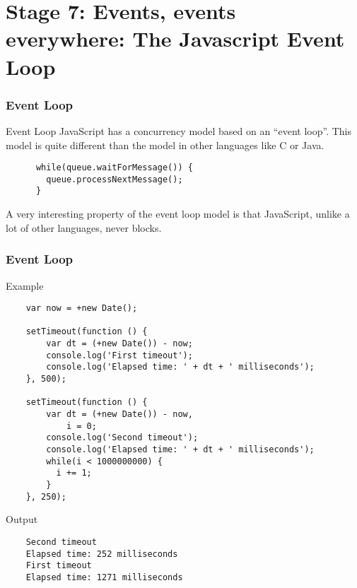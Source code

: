 \section{Stage 7: Events, events everywhere: The Javascript Event Loop}

\begin{frame}[fragile]
  \frametitle{Event Loop}
  \begin{block}{Event Loop}
    JavaScript has a concurrency model based on an ``event loop''. This model is quite different than the model in other languages like C or Java.
    {\scriptsize
    \begin{verbatim}
      while(queue.waitForMessage()) {
        queue.processNextMessage();
      }
    \end{verbatim}
    }
    \pause
    A very interesting property of the event loop model is that JavaScript, unlike a lot of other languages, never blocks.
  \end{block}
\end{frame}

\begin{frame}[fragile]
  \frametitle{Event Loop}

  \begin{block}{Example}
    {\tiny
    \begin{verbatim}
    var now = +new Date();

    setTimeout(function () {
        var dt = (+new Date()) - now;
        console.log('First timeout');
        console.log('Elapsed time: ' + dt + ' milliseconds');
    }, 500);

    setTimeout(function () {
        var dt = (+new Date()) - now,
            i = 0;
        console.log('Second timeout');
        console.log('Elapsed time: ' + dt + ' milliseconds');
        while(i < 1000000000) {
          i += 1;
        }
    }, 250);
    \end{verbatim}
    }
  \end{block}

  \pause

  \begin{block}{Output}
    {\tiny
    \begin{verbatim}
    Second timeout
    Elapsed time: 252 milliseconds
    First timeout
    Elapsed time: 1271 milliseconds
    \end{verbatim}
    }
  \end{block}
\end{frame}

